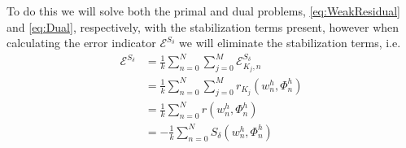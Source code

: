 To do this we will solve both the primal and dual problems,
\eqref{eq:WeakResidual} and \eqref{eq:Dual}, respectively, with the
stabilization terms present, however when calculating the error indicator
$\mathcal{E}^{S_{\delta}}$ we will eliminate the stabilization terms, i.e.
\begin{equation}
    \begin{split}
        \mathcal{E}^{S_{\delta}}
        &= \frac{1}{k} \sum_{n=0}^N \sum_{j=0}^M  \mathcal{E}^{S_{\delta}}_{K_j, n} \\
        &= \frac{1}{k} \sum_{n=0}^N \sum_{j=0}^M r_{K_j}(w^h_n, \Phi^h_n) \\
        &= \frac{1}{k} \sum_{n=0}^N r(w^h_n, \Phi^h_n) \\
        &= -\frac{1}{k} \sum_{n=0}^N S_{\delta}(w^h_n, \Phi^h_n)
    \end{split}
    \label{eq:StableErrorIndicator}
\end{equation}
